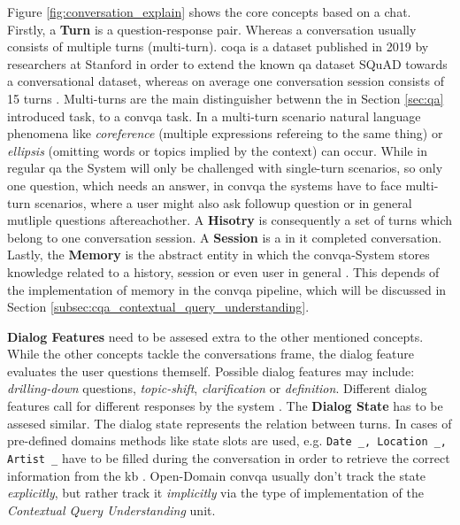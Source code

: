 Figure \ref{fig:conversation_explain} shows the core concepts based on a chat. Firstly, a \textbf{Turn} is a question-response pair. Whereas a conversation usually consists of multiple turns (multi-turn). \gls{coqa} is a dataset published in 2019 by researchers at Stanford in order to extend the known \gls{qa} dataset SQuAD towards a conversational dataset, whereas on average one conversation session consists of 15 turns \cite{reddy_coqa_2018}. Multi-turns are the main distinguisher betwenn the in Section \ref{sec:qa} introduced task, to a \gls{convqa} task. In a multi-turn scenario natural language phenomena like \textit{coreference} (multiple expressions refereing to the same thing) or \textit{ellipsis} (omitting words or topics implied by the context) can occur. While in regular \gls{qa} the System will only be challenged with single-turn scenarios, so only one question, which needs an answer, in \gls{convqa} the systems have to face multi-turn scenarios, where a user might also ask followup question or in general mutliple questions aftereachother. A \textbf{Hisotry} is consequently a set of turns which belong to one conversation session. A \textbf{Session} is a in it completed conversation. Lastly, the \textbf{Memory} is the abstract entity in which the \gls{convqa}-System stores knowledge related to a history, session or even user in general \cite{zamani_conversational_2023,gao_neural_2022}. This depends of the implementation of memory in the \gls{convqa} pipeline, which will be discussed in Section \ref{subsec:cqa_contextual_query_understanding}.

\textbf{Dialog Features} need to be assesed extra to the other mentioned concepts. While the other concepts tackle the conversations frame, the dialog feature evaluates the user questions themself. Possible dialog features may include: \textit{drilling-down} questions, \textit{topic-shift}, \textit{clarification} or \textit{definition}. Different dialog features call for different responses by the system \cite{gupta_conversational_2020}. The \textbf{Dialog State} has to be assesed similar. The dialog state represents the relation between turns. In cases of pre-defined domains methods like state slots are used, e.g. \verb |Date _, Location _, Artist _| have to be filled during the conversation in order to retrieve the correct information from the \gls{kb} \cite{rastogi_schema-guided_2020}. Open-Domain \gls{convqa} usually don't track the state \textit{explicitly}, but rather track it \textit{implicitly} via the type of implementation of the \textit{Contextual Query Understanding} unit.


